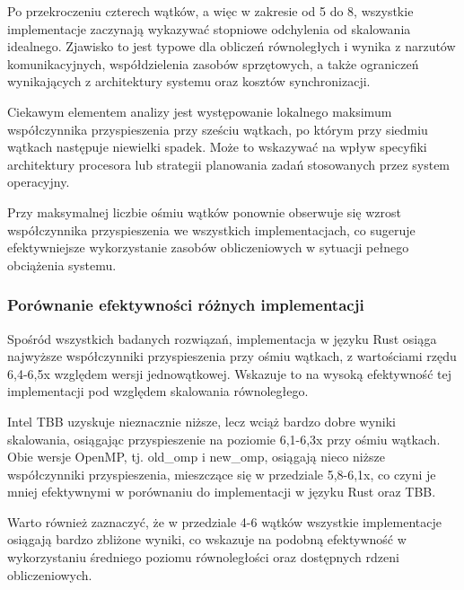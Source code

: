 Po przekroczeniu czterech wątków, a więc w zakresie od 5 do 8, wszystkie implementacje zaczynają wykazywać stopniowe odchylenia od skalowania idealnego. Zjawisko to jest typowe dla obliczeń równoległych i wynika z narzutów komunikacyjnych, współdzielenia zasobów sprzętowych, a także ograniczeń wynikających z architektury systemu oraz kosztów synchronizacji.

Ciekawym elementem analizy jest występowanie lokalnego maksimum współczynnika przyspieszenia przy sześciu wątkach, po którym przy siedmiu wątkach następuje niewielki spadek. Może to wskazywać na wpływ specyfiki architektury procesora lub strategii planowania zadań stosowanych przez system operacyjny.

Przy maksymalnej liczbie ośmiu wątków ponownie obserwuje się wzrost współczynnika przyspieszenia we wszystkich implementacjach, co sugeruje efektywniejsze wykorzystanie zasobów obliczeniowych w sytuacji pełnego obciążenia systemu.

\subsubsection{Porównanie efektywności różnych implementacji}
Spośród wszystkich badanych rozwiązań, implementacja w języku Rust osiąga najwyższe współczynniki przyspieszenia przy ośmiu wątkach, z wartościami rzędu 6,4-6,5x względem wersji jednowątkowej. Wskazuje to na wysoką efektywność tej implementacji pod względem skalowania równoległego.

Intel TBB uzyskuje nieznacznie niższe, lecz wciąż bardzo dobre wyniki skalowania, osiągając przyspieszenie na poziomie 6,1-6,3x przy ośmiu wątkach. Obie wersje OpenMP, tj. old\_omp i new\_omp, osiągają nieco niższe współczynniki przyspieszenia, mieszczące się w przedziale 5,8-6,1x, co czyni je mniej efektywnymi w porównaniu do implementacji w języku Rust oraz TBB.

Warto również zaznaczyć, że w przedziale 4-6 wątków wszystkie implementacje osiągają bardzo zbliżone wyniki, co wskazuje na podobną efektywność w wykorzystaniu średniego poziomu równoległości oraz dostępnych rdzeni obliczeniowych.

